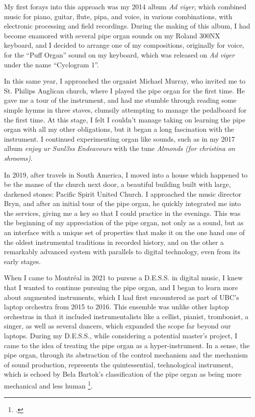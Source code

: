 \documentclass[12pt,twoside,maitrise]{dms_ks}
\theoremstyle{definition}
\begin{document}
My first forays into this approach was my 2014 album \textit{Ad viger}, which combined music for piano, guitar, flute, pipa, and voice, in various combinations, with electronic processing and field recordings. 
During the making of this album, I had become enamored with several pipe organ sounds on my Roland 300NX keyboard, and I decided to arrange one of my compositions, originally for voice, for the “Puff Organ” sound on my keyboard, which was released on \textit{Ad viger} under the name “Cyclogram 1”.

In this same year, I approached the organist Michael Murray, who invited me to St. 
Philips Anglican church, where I played the pipe organ for the first time. 
He gave me a tour of the instrument, and had me stumble through reading some simple hymns in three staves, clumsily attempting to manage the pedalboard for the first time. 
At this stage, I felt I couldn't manage taking on learning the pipe organ with all my other obligations, but it began a long fascination with the instrument. 
I continued experimenting organ like sounds, such as in my 2017 album \textit{enjoy ur Sunl3ss Endeavours} with the tune \textit{Almonds (for christina on shrooms)}. 

In 2019, after travels in South America, I moved into a house which happened to be the manse of the church next door, a beautiful building built with large, darkened stones: Pacific Spirit United Church. 
I approached the music director Bryn, and after an initial tour of the pipe organ, he quickly integrated me into the services, giving me a key so that I could practice in the evenings. 
This was the beginning of my appreciation of the pipe organ, not only as a sound, but as an interface with a unique set of properties that make it on the one hand one of the oldest instrumental traditions in recorded history, and on the other a remarkably advanced system with parallels to digital technology, even from its early stages.

When I came to Montréal in 2021 to pursue a D.E.S.S. in digital music, I knew that I wanted to continue pursuing the pipe organ, and I began to learn more about augmented instruments, which I had first encountered as part of UBC's laptop orchestra from 2015 to 2016. 
This ensemble was unlike other laptop orchestras in that it included instrumentalists like a cellist, pianist, trombonist, a singer, as well as several dancers, which expanded the scope far beyond our laptops. 
During my D.E.S.S., while considering a potential master's project, I came to the idea of treating the pipe organ as a hyper-instrument. 
In a sense, the pipe organ, through its abstraction of the control mechanism and the mechanism of sound production, represents the quintessential, technological instrument, which is echoed by Bela Bartok's classification of the pipe organ as being more mechanical and less human \footcite[24]{jorda_digital_2005}. 
 
\end{document}
